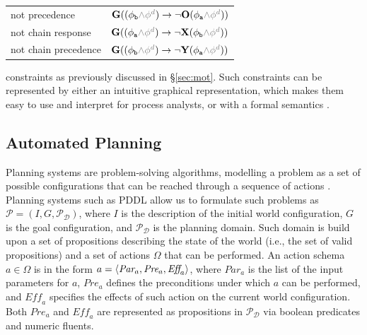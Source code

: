 \begin{table}[t!]
{\begin{tabular}{ll}
not precedence & $\lglobally( (\phi_{\texttt{b}} \textcolor{gray}{\wedge \phi^d}) \rightarrow \neg \lonce (\phi_{\texttt{a}} \textcolor{gray}{\wedge \phi^d}))$ \\
not chain response  & $\lglobally( (\phi_{\texttt{a}} \textcolor{gray}{\wedge \phi^d}) \rightarrow \neg \lnext (\phi_{\texttt{b}} \textcolor{gray}{\wedge \phi^d}))$ \\
not chain precedence  & $\lglobally( (\phi_{\texttt{b}} \textcolor{gray}{\wedge \phi^d}) \rightarrow \neg \lyesterday (\phi_{\texttt{a}} \textcolor{gray}{\wedge \phi^d}))$ \\
\bottomrule
\end{tabular}}
\end{table}





constraints as previously discussed in \S\ref{sec:mot}. Such constraints can be represented by either an intuitive graphical representation, which makes them easy to use and interpret for process analysts, or with a formal semantics \cite{LeoniMA12}.

\subsection{Automated Planning}\label{ssec:ap}
Planning systems are problem-solving algorithms, modelling a problem as a set of possible configurations that can be reached through a sequence of actions \cite{MaggiMCA18}. Planning systems such as PDDL allow us to formulate such problems as $\mathcal{P}=(I,G,\mathcal{P}_\mathcal
{D})$, where $I$ is the description of the initial world configuration, $G$ is the goal configuration, and $\mathcal{P}_\mathcal{D}$ is the planning domain. Such domain is build upon a set of propositions describing the state of the world (i.e., the set of valid propositions) and a set of actions $\Omega$ that can be performed. An action schema $a\in \Omega$ is in the form $a=\Braket{\textit{Par}_a,\textit{Pre}_a,\textit{Eff}_a}$, where $\textit{Par}_a$ is the list of the input parameters for $a$, $\textit{Pre}_a$ defines the preconditions under which $a$ can be performed, and $\textit{Eff}_a$ specifies the effects of such action on the current world configuration. Both  $\textit{Pre}_a$ and $\textit{Eff}_a$ are represented as propositions in $\mathcal{P}_\mathcal{D}$ via boolean predicates and numeric fluents.

